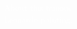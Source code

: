 \documentclass[preview,convert={density=600,outext=.png,command=\unexpanded{ {\convertexe\space -density \density\space\infile\space \ifx\size\empty\else -resize \size\fi\space -quality 90 -trim +repage -background "rgba(50,50,50,0.5)" -bordercolor "rgba(50,50,50,0.5)" -border 25 -flatten \outfile} } }]{standalone}
\begin{document}
\begin{center}
\textcolor{white}{
About this famous \\
Leonardo painting, \\}
\end{center}
\end{document}
